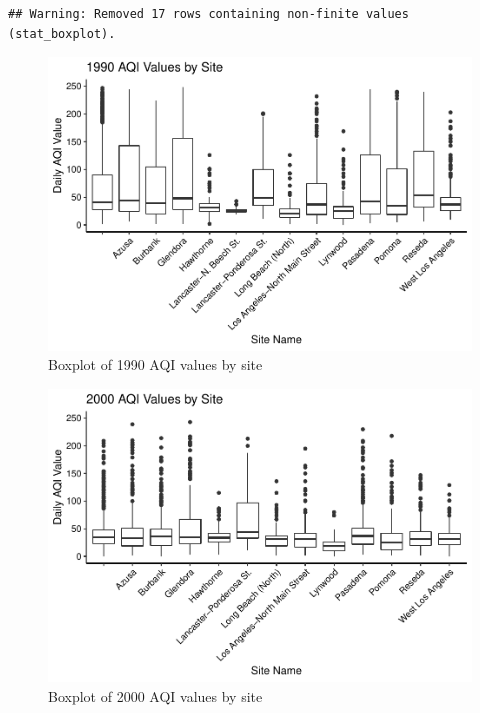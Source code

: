 \documentclass[12pt,]{article}
\begin{document}
\begin{verbatim}
## Warning: Removed 17 rows containing non-finite values (stat_boxplot).
\end{verbatim}

\begin{figure}
\centering
\includegraphics{Roth_ENV872_Project_files/figure-latex/box plot 2-1.pdf}
\caption{Boxplot of 1990 AQI values by site}
\end{figure}

\begin{figure}
\centering
\includegraphics{Roth_ENV872_Project_files/figure-latex/box plot 3-1.pdf}
\caption{Boxplot of 2000 AQI values by site}
\end{figure}
\end{document}
